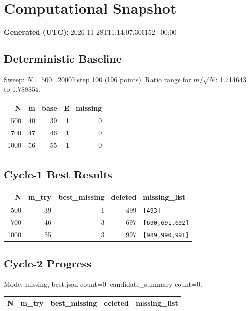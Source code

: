 \section*{Computational Snapshot}
\textbf{Generated (UTC):} 2026-11-28T11:14:07.300152+00:00\\

\subsection*{Deterministic Baseline}
Sweep: $N=500\ldots20000$ step 100 (196 points).
 Ratio range for $m/\sqrt{N}$: 1.714643 to 1.788854.

\begin{tabular}{rrrrr}
\hline
N & m & base & E & missing \\
\hline
500 & 40 & 39 & 1 & 0 \\
700 & 47 & 46 & 1 & 0 \\
1000 & 56 & 55 & 1 & 0 \\
\hline
\end{tabular}

\subsection*{Cycle-1 Best Results}
\begin{tabular}{rrrrl}
\hline
N & m\_try & best\_missing & deleted & missing\_list \\
\hline
500 & 39 & 1 & 499 & \texttt{[493]} \\
700 & 46 & 3 & 697 & \texttt{[690,691,692]} \\
1000 & 55 & 3 & 997 & \texttt{[989,990,991]} \\
\hline
\end{tabular}

\subsection*{Cycle-2 Progress}
Mode: missing, best.json count=0, candidate\_summary count=0.

\begin{tabular}{rrrrl}
\hline
N & m\_try & best\_missing & deleted & missing\_list \\
\hline
\hline
\end{tabular}

